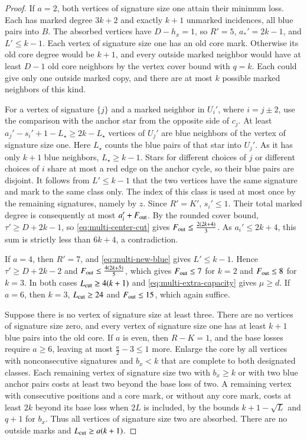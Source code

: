 \documentclass[preprint,11pt,numbers]{elsarticle-arxiv}
\numberwithin{equation}{section}
\theoremstyle{definition}
\begin{document}
\begin{proof}
If $a=2$, both vertices of signature size one attain their
minimum loss. Each has marked degree $3k+2$ and exactly $k+1$
unmarked incidences, all blue pairs into $B$. The absorbed
vertices have $D-h_x=1$, so $R'=5$, $a_*'=2k-1$, and
$L'\le k-1$. Each vertex of signature size one has an old core
mark. Otherwise its old core degree would be $k+1$, and every
outside marked neighbor would have at least $D-1$ old core
neighbors by the vertex cover bound with $q=k$. Each could give
only one outside marked copy, and there are at most $k$
possible marked neighbors of this kind.

For a vertex of signature $\{j\}$ and a marked neighbor in
$U_i'$, where $i=j\pm2$, use the comparison with the anchor
star from the opposite side of $c_j$. At least
$a_j'-s_i'+1-L_{\star}\ge2k-L_{\star}$ vertices of $U_j'$
are blue neighbors of the vertex of signature size one. Here
$L_{\star}$ counts the blue pairs of that star into $U_j'$.
As it has only $k+1$ blue neighbors, $L_{\star}\ge k-1$.
Stars for different choices of $j$ or different choices of
$i$ share at most a red edge on the anchor cycle, so their
blue pairs are disjoint. It follows from $L'\le k-1$ that the
two vertices have the same signature and mark to the same
class only. The index of this class is used at most once by
the remaining signatures, namely by $z$. Since $R'=K'$,
$s_i'\le1$. Their total marked degree is consequently at most
$a_i'+F_{\rm out}$. By the rounded cover bound,
$\tau'\ge D+2k-1$, so \eqref{eq:multi-center-cut} gives
$F_{\rm out}\le\frac{2(2k+4)}{3}$. As $a_i'\le2k+4$, this sum is
strictly less than $6k+4$, a contradiction.

If $a=4$, then $R'=7$, and \eqref{eq:multi-new-blue} gives
$L'\le k-1$. Hence $\tau'\ge D+2k-2$ and
$F_{\rm out}\le\frac{4(2k+5)}{5}$, which gives $F_{\rm out}\le7$ for $k=2$ and
$F_{\rm out}\le8$ for $k=3$. In both cases $L_{\rm cut}\ge4(k+1)$
and \eqref{eq:multi-extra-capacity} gives $\mu\ge d$.
If $a=6$, then $k=3$, $L_{\rm cut}\ge24$ and $F_{\rm out}\le15$,
which again suffice.

Suppose there is no vertex of signature size at least three.
There are no vertices of signature size zero, and every vertex
of signature size one has at least $k+1$ blue pairs into the
old core. If $a$ is even, then $R-K=1$, and the base losses
require $a\ge6$, leaving at most $\frac{a}{2}-3\le1$ more.
Enlarge the core by all vertices with nonconsecutive signatures
and $b_x<k$ that are complete to both designated classes.
Each remaining vertex of signature size two with $b_x\ge k$
or with two blue anchor pairs costs at least two beyond the
base loss of two. A remaining vertex with consecutive positions
and a core mark, or without any core mark, costs at least $2k$
beyond its base loss when $2L$ is included, by the bounds
$k+1-\sqrt L$ and $q+1$ for $b_x$. Thus all vertices of
signature size two are absorbed. There are no outside marks and
$L_{\rm cut}\ge a(k+1)$.


\end{proof}
\end{document}

